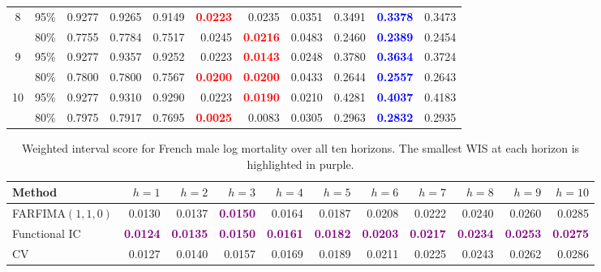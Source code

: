 \begin{longtable}[c]{ccrrrrrrrrr}
\cmidrule(lr){1-11}
8 & 95\% & 0.9277 & 0.9265 & 0.9149 & \textcolor{red}{\textbf{0.0223}} & 0.0235 & 0.0351 & 0.3491 & \textcolor{blue}{\textbf{0.3378}} & 0.3473 \\
 & 80\% & 0.7755 & 0.7784 & 0.7517 & 0.0245 & \textcolor{red}{\textbf{0.0216}} & 0.0483 & 0.2460 & \textcolor{blue}{\textbf{0.2389}} & 0.2454 \\
\cmidrule(lr){1-11}
9 & 95\% & 0.9277 & 0.9357 & 0.9252 & 0.0223 & \textcolor{red}{\textbf{0.0143}} & 0.0248 & 0.3780 & \textcolor{blue}{\textbf{0.3634}} & 0.3724 \\
 & 80\% & 0.7800 & 0.7800 & 0.7567 & \textcolor{red}{\textbf{0.0200}} & \textcolor{red}{\textbf{0.0200}} & 0.0433 & 0.2644 & \textcolor{blue}{\textbf{0.2557}} & 0.2643 \\
\cmidrule(lr){1-11}
10 & 95\% & 0.9277 & 0.9310 & 0.9290 & 0.0223 & \textcolor{red}{\textbf{0.0190}} & 0.0210 & 0.4281 & \textcolor{blue}{\textbf{0.4037}} & 0.4183 \\
 & 80\% & 0.7975 & 0.7917 & 0.7695 & \textcolor{red}{\textbf{0.0025}} & 0.0083 & 0.0305 & 0.2963 & \textcolor{blue}{\textbf{0.2832}} & 0.2935 \\
\end{longtable}
\endgroup
\endgroup

\begin{table}[!htb]
\centering
\begingroup\fontsize{7}{9}\selectfont
\setlength{\tabcolsep}{2.5pt}
\caption{Weighted interval score for French male log mortality over all ten horizons. The smallest WIS at each horizon is highlighted in purple.}
\label{tab:emp-male-mortality-wis}
\begin{tabular}{lrrrrrrrrrr}
\toprule
Method & $h=1$ & $h=2$ & $h=3$ & $h=4$ & $h=5$ & $h=6$ & $h=7$ & $h=8$ & $h=9$ & $h=10$ \\
\midrule
FARFIMA$(1,1,0)$ & 0.0130 & 0.0137 & \textcolor{purple}{\textbf{0.0150}} & 0.0164 & 0.0187 & 0.0208 & 0.0222 & 0.0240 & 0.0260 & 0.0285 \\
Functional IC & \textcolor{purple}{\textbf{0.0124}} & \textcolor{purple}{\textbf{0.0135}} & \textcolor{purple}{\textbf{0.0150}} & \textcolor{purple}{\textbf{0.0161}} & \textcolor{purple}{\textbf{0.0182}} & \textcolor{purple}{\textbf{0.0203}} & \textcolor{purple}{\textbf{0.0217}} & \textcolor{purple}{\textbf{0.0234}} & \textcolor{purple}{\textbf{0.0253}} & \textcolor{purple}{\textbf{0.0275}} \\
CV & 0.0127 & 0.0140 & 0.0157 & 0.0169 & 0.0189 & 0.0211 & 0.0225 & 0.0243 & 0.0262 & 0.0286 \\
\bottomrule
\end{tabular}
\endgroup
\end{table}

